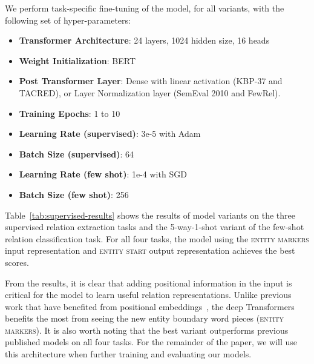 We perform task-specific fine-tuning of the \bert{} model, for all variants, with the
following set of hyper-parameters:
\begin{itemize}[noitemsep]
    \small
    \item \textbf{Transformer Architecture}: 24 layers, 1024 hidden size, 16 heads 
    \item \textbf{Weight Initialization}: BERT
    \item \textbf{Post Transformer Layer}: Dense with linear activation (KBP-37 and TACRED), 
    or Layer Normalization layer (SemEval 2010 and FewRel).
    \item \textbf{Training Epochs}: 1 to 10
    \item \textbf{Learning Rate (supervised)}: 3e-5 with Adam
    \item \textbf{Batch Size (supervised)}: 64
    \item \textbf{Learning Rate (few shot)}: 1e-4 with SGD
    \item \textbf{Batch Size (few shot)}: 256
\end{itemize}



Table~\ref{tab:supervised-results} shows the results of model variants on the three
supervised relation extraction tasks and the 5-way-1-shot variant of the few-shot relation classification task. For all four tasks, the model using the
\textsc{entity markers} input representation and \textsc{entity start} output representation
achieves the best scores.

From the results, it is clear that adding  positional information in the input is critical
for the model to learn useful relation representations. Unlike previous work that have
benefited from positional embeddings~\cite{zhang2017position, DBLP:journals/corr/abs-1807-03052}, the deep Transformers benefits
the most from seeing the new entity boundary word pieces (\textsc{entity markers}). It is
also worth noting that the best variant outperforms previous published models on all
four tasks. For the remainder of the paper, we will use this architecture when further
training and evaluating our  models.